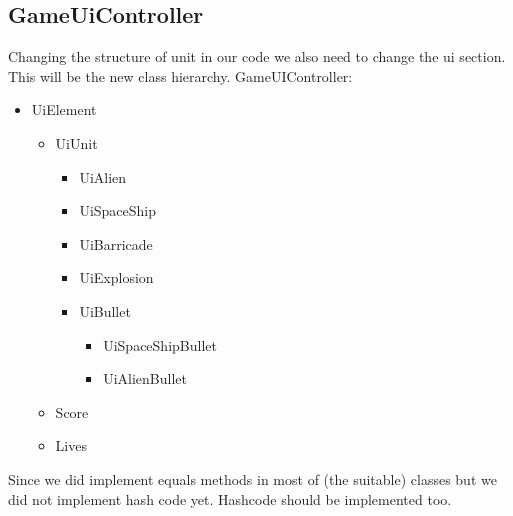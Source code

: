 \documentclass[10pt]{article}
\begin{document}
\subsection*{GameUiController}
Changing the structure of unit in our code we also need to change the ui section. This will be the new class hierarchy.	
GameUIController:
\begin{itemize}
	\item UiElement
	\begin{itemize}
		\item UiUnit
		\begin{itemize}
			\item UiAlien
			\item UiSpaceShip
			\item UiBarricade
			\item UiExplosion
			\item UiBullet
			\begin{itemize}
				\item UiSpaceShipBullet
				\item UiAlienBullet
			\end{itemize}
		\end{itemize}
		\item Score
		\item Lives
	\end{itemize}
\end{itemize}
Since we did implement equals methods in most of (the suitable) classes but we did not implement hash code yet. Hashcode should be implemented  too.
\end{document}
